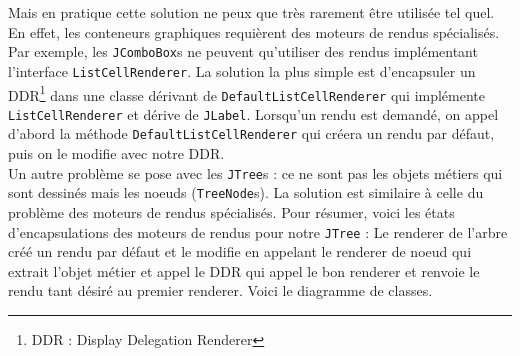 \documentclass{article}
\begin{document}
Mais en pratique cette solution ne peux que très rarement être utilisée tel quel. En effet, les conteneurs graphiques requièrent des moteurs de rendus spécialisés. Par exemple, les \texttt{JComboBox}s ne peuvent qu'utiliser des rendus implémentant l'interface \texttt{ListCellRenderer}. La solution la plus simple est d'encapsuler un DDR\footnote{DDR : Display Delegation Renderer} dans une classe dérivant de \texttt{DefaultListCellRenderer} qui implémente \texttt{ListCellRenderer} et dérive de \texttt{JLabel}. Lorsqu'un rendu est demandé, on appel d'abord la méthode \texttt{DefaultListCellRenderer} qui créera un rendu par défaut, puis on le modifie avec notre DDR.\\
Un autre problème se pose avec les \texttt{JTree}s : ce ne sont pas les objets métiers qui sont dessinés mais les noeuds (\texttt{TreeNode}s). La solution est similaire à celle du problème des moteurs de rendus spécialisés. Pour résumer, voici les états d'encapsulations des moteurs de rendus pour notre \texttt{JTree} : Le renderer de l'arbre créé un rendu par défaut et le modifie en appelant le renderer de noeud qui extrait l'objet métier et appel le DDR qui appel le bon renderer et renvoie le rendu tant désiré au premier renderer.
Voici le diagramme de classes.
\end{document}
